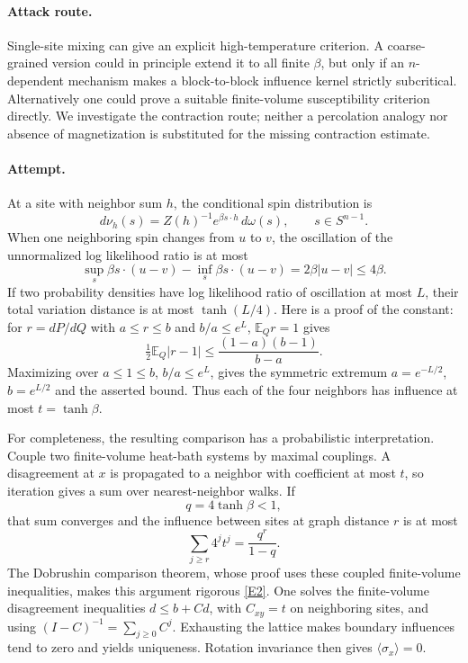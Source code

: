 \documentclass[11pt,a4paper]{article}
\newcommand{\E}{\mathbb{E}}
\newcommand{\eref}[2]{\hyperlink{extra:#1:#2}{[E#2]}}
\numberwithin{equation}{section}
\begin{document}
\paragraph{Attack route.}
Single-site mixing can give an explicit high-temperature criterion. A coarse-grained version could in principle extend it to all finite $\beta$, but only if an $n$-dependent mechanism makes a block-to-block influence kernel strictly subcritical. Alternatively one could prove a suitable finite-volume susceptibility criterion directly. We investigate the contraction route; neither a percolation analogy nor absence of magnetization is substituted for the missing contraction estimate.

\paragraph{Attempt.}
At a site with neighbor sum $h$, the conditional spin distribution is
\[
 d\nu_h(s)=Z(h)^{-1}e^{\beta s\cdot h}\,d\omega(s),\qquad s\in S^{n-1}.
\]
When one neighboring spin changes from $u$ to $v$, the oscillation of the unnormalized log likelihood ratio is at most
\[
 \sup_s\beta s\cdot(u-v)-\inf_s\beta s\cdot(u-v)
 =2\beta|u-v|\le4\beta.
\]
If two probability densities have log likelihood ratio of oscillation at most $L$, their total variation distance is at most $\tanh(L/4)$. Here is a proof of the constant: for $r=dP/dQ$ with $a\le r\le b$ and $b/a\le e^L$, $\E_Qr=1$ gives
\[
 \tfrac12\E_Q|r-1|\le\frac{(1-a)(b-1)}{b-a}.
\]
Maximizing over $a\le1\le b$, $b/a\le e^L$, gives the symmetric extremum $a=e^{-L/2}$, $b=e^{L/2}$ and the asserted bound. Thus each of the four neighbors has influence at most $t=\tanh\beta$.

For completeness, the resulting comparison has a probabilistic interpretation. Couple two finite-volume heat-bath systems by maximal couplings. A disagreement at $x$ is propagated to a neighbor with coefficient at most $t$, so iteration gives a sum over nearest-neighbor walks. If
\begin{equation}\label{eq187:smallbeta}
 q=4\tanh\beta<1,
\end{equation}
that sum converges and the influence between sites at graph distance $r$ is at most
\[
 \sum_{j\ge r}4^jt^j=\frac{q^r}{1-q}.
\]
The Dobrushin comparison theorem, whose proof uses these coupled finite-volume inequalities, makes this argument rigorous \eref{30006780}{2}. One solves the finite-volume disagreement inequalities $d\le b+Cd$, with $C_{xy}=t$ on neighboring sites, and using $(I-C)^{-1}=\sum_{j\ge0}C^j$. Exhausting the lattice makes boundary influences tend to zero and yields uniqueness. Rotation invariance then gives $\langle\sigma_x\rangle=0$.
\end{document}

